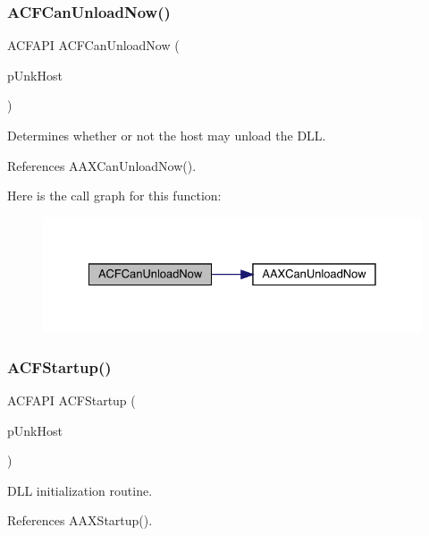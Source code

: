 \subsubsection{\texorpdfstring{ACFCanUnloadNow()}{ACFCanUnloadNow()}}
{\footnotesize\ttfamily A\+C\+F\+A\+PI A\+C\+F\+Can\+Unload\+Now (\begin{DoxyParamCaption}\item[{\mbox{\hyperlink{a01409}{I\+A\+C\+F\+Unknown}} $\ast$}]{p\+Unk\+Host }\end{DoxyParamCaption})}



Determines whether or not the host may unload the D\+LL. 



References A\+A\+X\+Can\+Unload\+Now().

Here is the call graph for this function\+:
\nopagebreak
\begin{figure}[H]
\begin{center}
\leavevmode
\includegraphics[width=328pt]{a00500_ae5327dbd8fd750c78eca3892831f4ad8_cgraph}
\end{center}
\end{figure}
\mbox{\label{a00500_ada314f5040499160998c3c444fbe4dfd}} 
\subsubsection{\texorpdfstring{ACFStartup()}{ACFStartup()}}
{\footnotesize\ttfamily A\+C\+F\+A\+PI A\+C\+F\+Startup (\begin{DoxyParamCaption}\item[{\mbox{\hyperlink{a01409}{I\+A\+C\+F\+Unknown}} $\ast$}]{p\+Unk\+Host }\end{DoxyParamCaption})}



D\+LL initialization routine. 



References A\+A\+X\+Startup().

